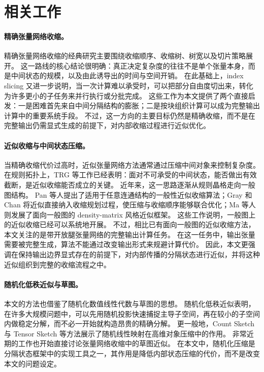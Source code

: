 \section{相关工作}

\paragraph{精确张量网络收缩。}
精确张量网络收缩的经典研究主要围绕收缩顺序、收缩树、树宽以及切片策略展开。
这一路线的核心结论很明确：真正决定复杂度的往往不是单个张量本身，而是中间状态的规模，以及由此诱导出的时间与空间开销\cite{markov2008simulating,dumitrescu2018benchmarking,jakes2019carving,gray2021hyperoptimized}。
在此基础上，index slicing 又进一步说明，当一次计算难以承受时，可以把部分自由度切出来，转化为许多更小的子任务来并行执行或分批完成\cite{huang2021efficient}。
这些工作为本文提供了两个直接启发：一是困难首先来自中间分隔结构的膨胀；二是按块组织计算可以成为完整输出计算中的重要系统手段。
不过，这一方向的主要目标仍然是精确收缩，而不是在完整输出仍需显式生成的前提下，对内部收缩过程进行近似优化。

\paragraph{近似收缩与中间状态压缩。}
当精确收缩代价过高时，近似张量网络方法通常通过压缩中间对象来控制复杂度。
在规则拓扑上，TRG 等工作已经表明：面对不可承受的中间状态，能否做出有效截断，是近似收缩能否成立的关键\cite{levin2007trg}。
近年来，这一思路逐渐从规则晶格走向一般图结构。
Pan 等人提出了适用于任意连通结构的一般性近似收缩算法\cite{pan2020contracting}；Gray 和 Chan 将近似直接纳入收缩规划过程，使压缩与收缩顺序能够联合优化\cite{gray2024hyperoptimized}；Ma 等人则发展了面向一般图的 density-matrix 风格近似框架\cite{ma2024approximate}。
这些工作说明，一般图上的近似收缩已经可以系统地开展。
不过，相比已有面向一般图的近似收缩方法，本文关注的是带开放腿张量网络的完整输出计算任务。
在这一任务中，输出张量需要被完整生成，算法不能通过改变输出形式来规避计算代价。
因此，本文更强调在保持输出边界显式存在的前提下，对内部传播的分隔状态进行近似，并将这种近似组织到完整的收缩流程之中。

\paragraph{随机化低秩近似与草图。}
本文的方法也借鉴了随机化数值线性代数与草图的思想。
随机化低秩近似表明，在许多大规模问题中，可以先用随机投影快速捕捉主导子空间，再在较小的子空间内做稳定分解，而不必一开始就构造昂贵的精确分解\cite{halko2011finding}。
更一般地，Count Sketch 与 Tensor Sketch 等方法展示了随机线性映射在高维对象压缩中的作用\cite{charikar2004finding,pham2013fast}。
非常近期的工作也开始直接讨论张量网络收缩中的草图近似\cite{heddes2026approximating}。
在本文中，随机化压缩是分隔状态框架中的实现工具之一，其作用是降低内部状态压缩的代价，而不是改变本文的问题设定。

